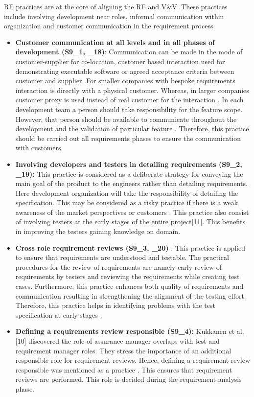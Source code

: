 \documentclass{article}
\begin{document}
RE practices are at the core of aligning the RE and V\&V\cite{bjarnason2014challengesS9}. These practices include involving development near roles, informal communication within organization and customer communication in the requirement process.

\begin{itemize}
    \item \textbf{Customer communication at all levels and in all phases of development (S9\_1, \cite{bjarnason2014alignment}\_18)}: Communication can be made in the mode of customer-supplier for co-location, customer based interaction used for demonstrating executable software or agreed acceptance criteria between customer and supplier \cite{bjarnason2014challengesS9}.For smaller companies with bespoke requirements interaction is directly with a physical customer. Whereas, in larger companies customer proxy is used instead of real customer for the interaction \cite{bjarnason2014challengesS9}. In each development team a person should take responsibility for the feature scope. However, that person should be available to communicate throughout the development and the validation of particular feature \cite{bjarnason2014challengesS9}. Therefore, this practice should be carried out all requirements phases to ensure the communication with customers.
    \item \textbf{Involving developers and testers in detailing requirements (S9\_2,  \cite{bjarnason2014alignment}\_19): }
    This practice is considered as a deliberate strategy for conveying the main goal of the product to the engineers rather than detailing requirements. Here development organization will take the responsibility of detailing the specification. This may be considered as a risky practice if there is a weak awareness of the market perspectives or customers \cite{bjarnason2014challengesS9}. This practice also consist of involving testers at the early stages of the entire project[11]. This benefits in improving the testers gaining knowledge on domain\cite{bjarnason2014challengesS9}. 
    \item \textbf{Cross role requirement reviews (S9\_3, \cite{bjarnason2014alignment}\_20)} : This practice is applied to ensure that requirements are understood and testable. The practical procedures for the review of requirements are namely early review of requirements by testers and reviewing the requirements while creating test cases. Furthermore, this practice enhances both quality of requirements and communication resulting in strengthening the alignment of the testing effort. Therefore, this practice helps in identifying problems with the test specification at early stages \cite{bjarnason2014challengesS9}. 
    \item \textbf{Defining a requirements review responsible (S9\_4):} Kukkanen et al. [10] discovered the role of assurance manager overlaps with test and requirement manager roles. They stress the importance of an additional responsible role for requirement reviews. Hence, defining a requirement review responsible was mentioned as a practice \cite{bjarnason2014challengesS9}. This ensures that requirement reviews are performed. This role is decided during the requirement analysis phase.
    

\end{itemize}
\end{document}
